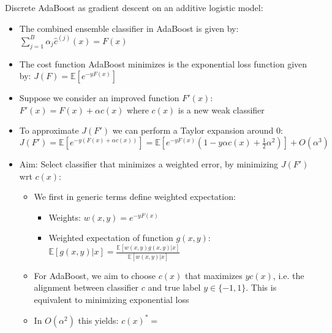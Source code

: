 Discrete AdaBoost as gradient descent on an additive logistic model:
\begin{itemize}
    \item The combined ensemble classifier in AdaBoost is given by: $\sum_{j=1}^B \alpha_j \hat{c}^{(j)}(x) = F(x)$
    \item The cost function AdaBoost minimizes is the exponential loss function given by: $J(F) = \mathbb{E} [ e^{-y F(x)} ]$ 
    \item Suppose we consider an improved function $F'(x)$: $F'(x) = F(x) + \alpha c(x)$ where $c(x)$ is a new weak classifier
    \item To approximate $J(F')$ we can perform a Taylor expansion around 0: $J(F') = \mathbb{E} [ e^{-y (F(x) + \alpha c(x))} ] = \mathbb{E} [ e^{-y F(x)} (1 - y \alpha c(x) + \frac{1}{2}\alpha^2) ] + O(\alpha^3)$
    \item Aim: Select classifier that minimizes a weighted error, by minimizing $J(F')$ wrt $c(x)$:
    \begin{itemize}
        \item We first in generic terms define weighted expectation:
        \begin{itemize}
            \item Weights: $w(x,y) = e^{-y F(x)}$
            \item Weighted expectation of function $g(x,y)$: $\mathbb{E} [g(x,y) | x] = \frac{ \mathbb{E} [w(x,y) g(x,y) | x] }{ \mathbb{E} [w(x,y) | x] }$
        \end{itemize}
        \item For AdaBoost, we aim to choose $c(x)$ that maximizes $y c(x)$, i.e. the alignment between classifier $c$ and true label $y \in \{-1,1\}$. This is equivalent to minimizing exponential loss
        \item In $O(\alpha^2)$ this yields: $c(x)^* =$ 
\end{itemize}
\end{itemize}

